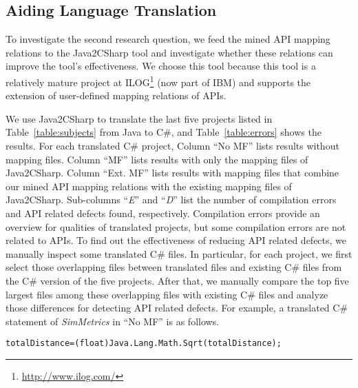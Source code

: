 \subsection{Aiding Language Translation}
\label{sec:evaluation:migration}

To investigate the second research question, we feed the
mined API mapping relations to the Java2CSharp tool and
investigate whether these relations can improve the tool's
effectiveness. We choose this tool because this tool is a relatively
mature project at ILOG\footnote{\url{http://www.ilog.com/}} (now
part of IBM) and supports the extension of user-defined mapping
relations of APIs.

We use Java2CSharp to translate the last five projects listed in
Table~\ref{table:subjects} from Java to C\#, and
Table~\ref{table:errors} shows the results. For each translated C\#
project, Column ``No MF'' lists results without mapping files.
Column ``MF'' lists results with only the mapping files of Java2CSharp.
Column ``Ext. MF'' lists results with mapping files that combine
our mined API mapping relations with the existing mapping files of Java2CSharp.
Sub-columns ``\emph{E}'' and ``\emph{D}'' list the number of
compilation errors and API related defects found, respectively. Compilation errors provide an overview for qualities of translated projects, but some compilation errors are not related to APIs.
To find out the effectiveness of reducing API related defects, we manually inspect some translated C\# files. In particular, for each project,
we first select those overlapping files between translated files and existing C\# files
from the C\# version of the five projects. After that, we manually compare
the top five largest files among these overlapping files with existing C\# files and analyze those differences for detecting API related defects. For example, a translated C\# statement of \emph{SimMetrics} in ``No MF'' is as follows.

\begin{CodeOut}\vspace*{-1.8ex}
\begin{alltt}
 totalDistance = (float)Java.Lang.Math.Sqrt(totalDistance);
\end{alltt}
\end{CodeOut}\vspace*{-1.8ex}

